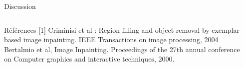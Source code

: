 \documentclass[final,hyperref={pdfpagelabels=false}]{beamer}
\begin{document}
\begin{frame}[t]
\begin{columns}[t]
\begin{column}{.930\textwidth}
\begin{block}{\Large Discussion}
\begin{columns}[t]
\begin{column}{.496\textwidth}
\begin{block}{Références}
[1] Criminisi et al : Region filling and object removal by exemplar based image inpainting. IEEE Transactions on image processing, 2004 \hfill \break
[2] Bertalmio et al, Image Inpainting. Proceedings of the 27th annual conference on Computer graphics and interactive techniques, 2000.  

\end{block}
\end{column}
\end{columns}
\end{block}
\end{column}
\begin{column}{.02\textwidth} \end{column}
\end{columns}

\end{frame}

\end{document}
